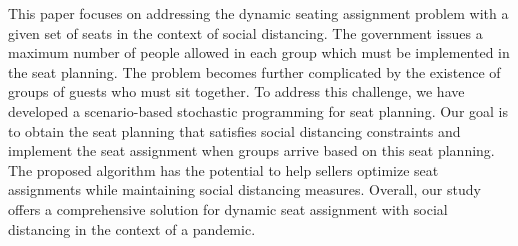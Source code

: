 



This paper focuses on addressing the dynamic seating assignment problem with a given set of seats in the context of social distancing. The government issues a maximum number of people allowed in each group which must be implemented in the seat planning. The problem becomes further complicated by the existence of groups of guests who must sit together. To address this challenge, we have developed a scenario-based stochastic programming for seat planning. Our goal is to obtain the seat planning that satisfies social distancing constraints and implement the seat assignment when groups arrive based on this seat planning. The proposed algorithm has the potential to help sellers optimize seat assignments while maintaining social distancing measures. Overall, our study offers a comprehensive solution for dynamic seat assignment with social distancing in the context of a pandemic.


